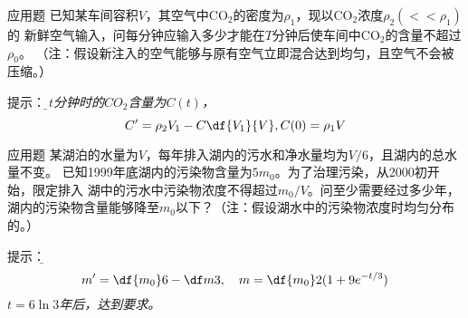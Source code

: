 \begin{frame}{应用题}
	\linespread{1.2}
	已知某车间容积$V$，其空气中CO$_2$的密度为$\rho_1$，现以CO$_2$浓度$\rho_2(<<\rho_1)$的
	新鲜空气输入，问每分钟应输入多少才能在$T$分钟后使车间中CO$_2$的含量不超过$\rho_0$。
	（注：假设新注入的空气能够与原有空气立即混合达到均匀，且空气不会被压缩。）

	\pause\alert{提示：}\it\b 设$t$分钟时的$CO_2$含量为$C(t)$，
	$$C'=\rho_2V_1-C\df{V_1}{V},C(0)=\rho_1V$$
\end{frame}

\begin{frame}{应用题}
	\linespread{1.2}
	某湖泊的水量为$V$，每年排入湖内的污水和净水量均为$V/6$，且湖内的总水量不变。
	已知1999年底湖内的污染物含量为$5m_0$。为了治理污染，从2000初开始，限定排入
	湖中的污水中污染物浓度不得超过$m_0/V$。问至少需要经过多少年，
	湖内的污染物含量能够降至$m_0$以下？（注：假设湖水中的污染物浓度时均匀分布的。）

	\pause\alert{提示：}\it\b 
	$$m'=\df{m_0}6-\df m3,\quad m=\df{m_0}2(1+9e^{-t/3})$$
	$t=6\ln3$年后，达到要求。
\end{frame}